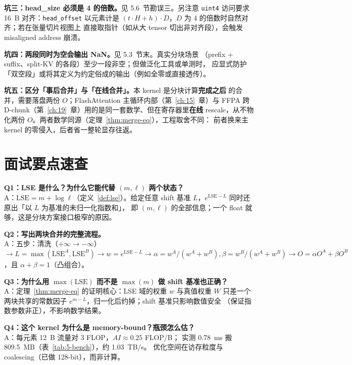 \textbf{坑三：head\_size 必须是 4 的倍数。}见 5.6~节勘误三。另注意
\texttt{uint4} 访问要求 16~B 对齐：\texttt{head\_offset} 以元素计是
$(t \cdot H + h) \cdot D$，$D$ 为 4 的倍数时自然对齐；若在张量切片视图上
直接取指针（如从大 tensor 切出非对齐段），会触发 misaligned address 崩溃。

\textbf{坑四：两段同时为空会输出 NaN。}见 5.3~节末。真实分块场景
（prefix + suffix、split-KV 的各段）至少一段非空；但做泛化工具或单测时，
应显式防护「双空段」或将其定义为约定俗成的输出（例如全零或直接透传）。

\textbf{坑五：区分「事后合并」与「在线合并」。}本 kernel 是分块计算\textbf{完成之后}
的合并，需要落盘两份 $O$；FlashAttention 主循环内部（第~\ref{ch:15}~章）与
FFPA 跨 D-chunk（第~\ref{ch:19}~章）用的是同一套数学、但在寄存器里\textbf{在线}
rescale，从不物化两份 $O$。两者数学同源（定理~\ref{thm:merge-eq}），工程取舍不同：
前者换来主 kernel 的零侵入，后者省一整轮显存往返。

\section{面试要点速查}

\textbf{Q1：LSE 是什么？为什么它能代替 $(m, \ell)$ 两个状态？}\\
A：$\mathrm{LSE} = m + \log \ell$（定义~\ref{def:lse}）。给定任意 shift 基准
$L$，$e^{\mathrm{LSE} - L}$ 同时还原出「以 $L$ 为基准的未归一化指数和」，
即 $(m, \ell)$ 的全部信息；一个 float 就够，这是分块方案接口极窄的原因。

\textbf{Q2：写出两块合并的完整流程。}\\
A：五步：清洗（$+\infty \to -\infty$）$\to L = \max(\mathrm{LSE}^{A},
\mathrm{LSE}^{B}) \to w = e^{\mathrm{LSE} - L} \to
\alpha = w^{A}/(w^{A}+w^{B}), \beta = w^{B}/(w^{A}+w^{B}) \to
O = \alpha O^{A} + \beta O^{B}$，且 $\alpha + \beta = 1$（凸组合）。

\textbf{Q3：为什么用 $\max(\mathrm{LSE})$ 而不是 $\max(m)$ 做 shift 基准也正确？}\\
A：定理~\ref{thm:merge-eq} 的证明核心：LSE 域的权重 $w$ 与真值权重 $W$ 只差一个
两块共享的常数因子 $e^{m - L}$，归一化后约掉；shift 基准只影响数值安全
（保证指数参数非正），不影响数学结果。

\textbf{Q4：这个 kernel 为什么是 memory-bound？瓶颈怎么估？}\\
A：每元素 12~B 流量对 3 FLOP，$AI \approx 0.25$ FLOP/B；
实测 0.78~ms 搬 809.5~MB（表~\ref{tab:5-bench}），约 1.03~TB/s。
优化空间在访存粒度与 coalescing（已做 128-bit），而非计算。

